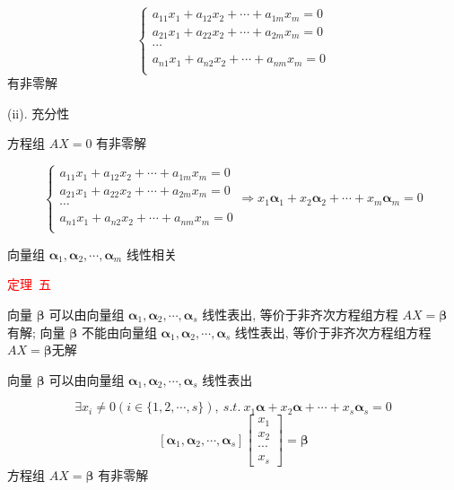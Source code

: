 \begin{theorem}[判别线性相关性的七大定理]
\begin{anymark}[证明]
		$$\begin{cases}
			a_{11}x_{1}+a_{12}x_{2}+\cdots+a_{1m}x_{m}=0\\
			a_{21}x_{1}+a_{22}x_{2}+\cdots+a_{2m}x_{m}=0\\
			\cdots\\
			a_{n1}x_{1}+a_{n2}x_{2}+\cdots+a_{nm}x_{m}=0\\
		\end{cases}$$
		有非零解
		
		(ii). 充分性
		
		方程组 $AX=0$ 有非零解

		$$\begin{cases}
			a_{11}x_{1}+a_{12}x_{2}+\cdots+a_{1m}x_{m}=0\\
			a_{21}x_{1}+a_{22}x_{2}+\cdots+a_{2m}x_{m}=0\\
			\cdots\\
			a_{n1}x_{1}+a_{n2}x_{2}+\cdots+a_{nm}x_{m}=0\\
		\end{cases}\Rightarrow
		x_{1}\boldsymbol{\alpha}_{1} + x_{2}\boldsymbol{\alpha}_{2} + \cdots + x_{m}\boldsymbol{\alpha}_{m}=0$$
		
		向量组 $\boldsymbol{\alpha}_{1},\boldsymbol{\alpha}_{2}, \cdots, \boldsymbol{\alpha}_{m}$ 线性相关
	\end{anymark}
	
	\textcolor{red}{定理\ 五}
	
	向量 $\boldsymbol{\beta}$ 可以由向量组 $\boldsymbol{\alpha}_{1},\boldsymbol{\alpha}_{2}, \cdots, \boldsymbol{\alpha}_{s}$ 线性表出, 等价于非齐次方程组方程 $AX=\boldsymbol{\beta}$ 有解;
	向量 $\boldsymbol{\beta}$ 不能由向量组 $\boldsymbol{\alpha}_{1},\boldsymbol{\alpha}_{2}, \cdots, \boldsymbol{\alpha}_{s}$ 线性表出, 等价于非齐次方程组方程$AX=\boldsymbol{\beta}$无解
	\begin{anymark}[证明]

		向量 $\boldsymbol{\beta}$ 可以由向量组 $\boldsymbol{\alpha}_{1},\boldsymbol{\alpha}_{2}, \cdots, \boldsymbol{\alpha}_{s}$ 线性表出
		
		$$\exists x_{i}\neq 0(i\in \{1,2,\cdots,s\}),\ s.t.\ x_{1}\boldsymbol{\alpha} + x_{2}\boldsymbol{\alpha} + \cdots + x_{s}\boldsymbol{\alpha}_{s} = 0$$  
		$$[\boldsymbol{\alpha}_{1},\boldsymbol{\alpha}_{2}, \cdots, \boldsymbol{\alpha}_{s}]
		\begin{bmatrix}
			x_{1}\\
			x_{2}\\
			\cdots\\
			x_{s}
		\end{bmatrix} = \boldsymbol{\beta}$$
		方程组 $AX = \boldsymbol{\beta}$ 有非零解
	\end{anymark}
	

\end{theorem}
